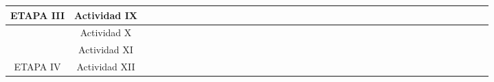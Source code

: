 \begin{table}[H]
\begin{tabular}{cc|llll|llll|llll|llll|llll|llll|llll|llll|llll|}
\multicolumn{1}{|c|}{\multirow{-3}{*}{\cellcolor[HTML]{FFCE93}ETAPA III}} & \cellcolor[HTML]{FFCE93}Actividad IX &  &  &  &  &  &  &  &  &  &  &  &  &  &  &  &  &  &  &  &  &  &  &  &  &  &  & \cellcolor[HTML]{32CB00} & \cellcolor[HTML]{32CB00} &  &  &  &  &  &  &  &  \\ \hline
\multicolumn{1}{|c|}{\cellcolor[HTML]{FFCE93}} & \cellcolor[HTML]{FFCE93}Actividad X &  &  & \cellcolor[HTML]{00D2CB} &  & \cellcolor[HTML]{00D2CB} &  & \cellcolor[HTML]{00D2CB} &  & \cellcolor[HTML]{00D2CB} &  & \cellcolor[HTML]{00D2CB} &  & \cellcolor[HTML]{00D2CB} &  & \cellcolor[HTML]{00D2CB} &  & \cellcolor[HTML]{00D2CB} &  & \cellcolor[HTML]{00D2CB} &  & \cellcolor[HTML]{00D2CB} &  & \cellcolor[HTML]{00D2CB} &  & \cellcolor[HTML]{00D2CB} &  & \cellcolor[HTML]{00D2CB} &  & \cellcolor[HTML]{00D2CB} & \cellcolor[HTML]{00D2CB} & \cellcolor[HTML]{00D2CB} & \cellcolor[HTML]{00D2CB} &  &  &  &  \\ \cline{2-38} 
\multicolumn{1}{|c|}{\cellcolor[HTML]{FFCE93}} & \cellcolor[HTML]{FFCE93}Actividad XI &  &  &  &  &  &  &  &  &  &  &  &  &  &  &  &  &  &  &  &  &  &  &  &  &  &  &  &  &  &  & \cellcolor[HTML]{00D2CB} & \cellcolor[HTML]{00D2CB} &  &  &  &  \\ \cline{2-38} 
\multicolumn{1}{|c|}{\multirow{-3}{*}{\cellcolor[HTML]{FFCE93}ETAPA IV}} & \cellcolor[HTML]{FFCE93}Actividad XII &  &  &  &  &  &  &  &  &  &  &  &  &  &  &  &  &  &  &  &  &  &  &  &  &  &  &  &  &  &  &  &  & \cellcolor[HTML]{00D2CB} & \cellcolor[HTML]{00D2CB} & \cellcolor[HTML]{00D2CB} & \cellcolor[HTML]{00D2CB} \\ \hline
\end{tabular}
\end{table}